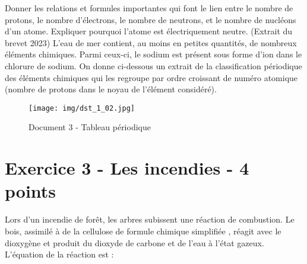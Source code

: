\documentclass[answers]{exam}
\begin{document}
\begin{questions}
  \question[2] Donner les relations et formules importantes qui font le lien entre le nombre de protons, le nombre d'électrons, le nombre de neutrons, et le nombre de nucléons d'un atome.
  \question[1]  Expliquer pourquoi l'atome est électriquement neutre.
  \question[2] (Extrait du brevet 2023) L'eau de mer contient, au moins en petites quantités, de nombreux éléments chimiques. Parmi ceux-ci, le sodium est présent sous forme d’ion dans le chlorure de sodium. On
donne ci-dessous un extrait de la classification périodique des éléments chimiques qui les
regroupe par ordre croissant de numéro atomique (nombre de protons dans le noyau de
l’élément considéré).

\begin{figure}[H]
  \centering
  \texttt{[image: img/dst\_1\_02.jpg]}
  \captionsetup{labelformat=empty}
  \caption{\label{} Document 3 - Tableau périodique}
\end{figure} 


\end{questions}

\section*{Exercice 3 - Les incendies - 4 points}

Lors d’un incendie de forêt, les arbres subissent une réaction de combustion. Le bois, assimilé à de
la cellulose de formule chimique simplifiée , réagit avec le dioxygène et produit du dioxyde
de carbone et de l’eau à l’état gazeux. L’équation de la réaction est :
\end{document}
